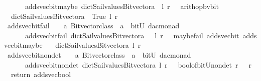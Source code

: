 \begin{isabellebody}
\ \ \ \ \ {\isachardoublequoteopen}\ adds{\isacharunderscore}vec{\isacharunderscore}bit{\isacharunderscore}maybe\ dict{\isacharunderscore}Sail{}{\isacharunderscore}values{\isacharunderscore}Bitvector{\isacharunderscore}a\ \ l\ r\ {\isacharequal}\ {\isacharparenleft}\ arith{\isacharunderscore}op{\isacharunderscore}bv{\isacharunderscore}bit\ \isanewline
\ \ dict{\isacharunderscore}Sail{}{\isacharunderscore}values{\isacharunderscore}Bitvector{\isacharunderscore}a\ {\isacharparenleft}{\isacharplus}{\isacharparenright}\ True\ l\ r\ {\isacharparenright}{\isachardoublequoteclose}\isanewline
\isanewline
{}\isamarkupfalse%
\ adds{\isacharunderscore}vec{\isacharunderscore}bit{\isacharunderscore}fail\ \ {\isacharcolon}{\isacharcolon}\ {\isachardoublequoteopen}\ {\isacharprime}a\ Bitvector{\isacharunderscore}class\ {\isasymRightarrow}\ {\isacharprime}a\ {\isasymRightarrow}\ bitU\ {\isasymRightarrow}{\isacharparenleft}{\isacharprime}d{\isacharcomma}{\isacharprime}a{\isacharcomma}{\isacharprime}c{\isacharparenright}monad\ {\isachardoublequoteclose}\ \ \ \isanewline
\ \ \ \ \ {\isachardoublequoteopen}\ adds{\isacharunderscore}vec{\isacharunderscore}bit{\isacharunderscore}fail\ dict{\isacharunderscore}Sail{}{\isacharunderscore}values{\isacharunderscore}Bitvector{\isacharunderscore}a\ \ \ l\ r\ {\isacharequal}\ {\isacharparenleft}\ maybe{\isacharunderscore}fail\ {\isacharparenleft}{\isacharprime}{\isacharprime}adds{\isacharunderscore}vec{\isacharunderscore}bit{\isacharprime}{\isacharprime}{\isacharparenright}\ {\isacharparenleft}adds{\isacharunderscore}vec{\isacharunderscore}bit{\isacharunderscore}maybe\ \isanewline
\ \ dict{\isacharunderscore}Sail{}{\isacharunderscore}values{\isacharunderscore}Bitvector{\isacharunderscore}a\ l\ r{\isacharparenright}{\isacharparenright}{\isachardoublequoteclose}\isanewline
\isanewline
{}\isamarkupfalse%
\ adds{\isacharunderscore}vec{\isacharunderscore}bit{\isacharunderscore}nondet\ \ {\isacharcolon}{\isacharcolon}\ {\isachardoublequoteopen}\ {\isacharprime}a\ Bitvector{\isacharunderscore}class\ {\isasymRightarrow}\ {\isacharprime}a\ {\isasymRightarrow}\ bitU\ {\isasymRightarrow}{\isacharparenleft}{\isacharprime}d{\isacharcomma}{\isacharprime}a{\isacharcomma}{\isacharprime}c{\isacharparenright}monad\ {\isachardoublequoteclose}\ \ \ \isanewline
\ \ \ \ \ {\isachardoublequoteopen}\ adds{\isacharunderscore}vec{\isacharunderscore}bit{\isacharunderscore}nondet\ dict{\isacharunderscore}Sail{}{\isacharunderscore}values{\isacharunderscore}Bitvector{\isacharunderscore}a\ l\ r\ {\isacharequal}\ {\isacharparenleft}\ bool{\isacharunderscore}of{\isacharunderscore}bitU{\isacharunderscore}nondet\ r\ {\isasymbind}\ {\isacharparenleft}{\isasymlambda}\ r\ {\isachardot}\ \ return\ {\isacharparenleft}adds{\isacharunderscore}vec{\isacharunderscore}bool\ \isanewline

\end{isabellebody}
